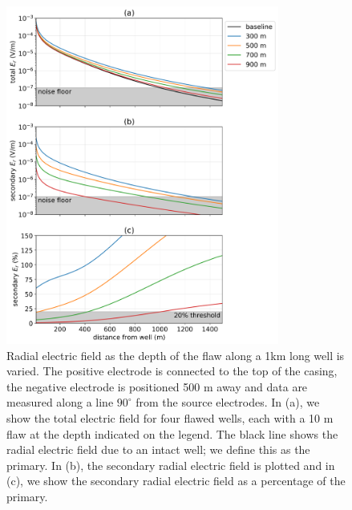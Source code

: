 \begin{figure}
    \begin{center}
    \includegraphics[width=0.8\textwidth]{figures/integrity_depth.png}
    \end{center}
\caption{
    Radial electric field as the depth of the flaw along a 1km long well is varied.
    The positive electrode is connected to the top of the casing, the negative electrode
    is positioned 500 m away and data are measured along a line $90^\circ$ from the
    source electrodes. In (a), we show the total electric field for four flawed wells,
    each with a 10 m flaw at the depth indicated on the legend. The black line shows
    the radial electric field due to an intact well; we define this as the primary.
    In (b), the secondary radial electric field is plotted and in (c), we show the
    secondary radial electric field as a percentage of the primary.
}
\label{fig:integrity_depth}
\end{figure}
